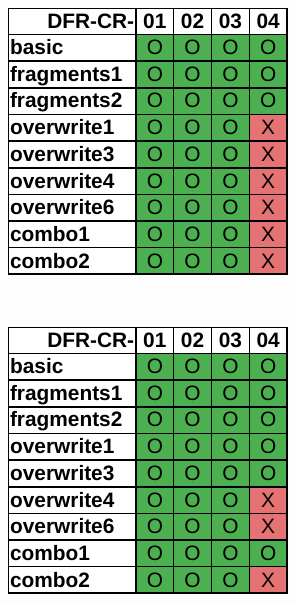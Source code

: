 \begin{figure}
    \centering

    \begin{subfigure}{0.3\linewidth}
        \includegraphics[width=\linewidth]{fig/autopsy_results_ntfs.pdf}
    \end{subfigure}~~
    \begin{subfigure}{0.3\linewidth}
        \includegraphics[width=\linewidth]{fig/ftk_results_ntfs.pdf}

\end{subfigure}
\end{figure}
